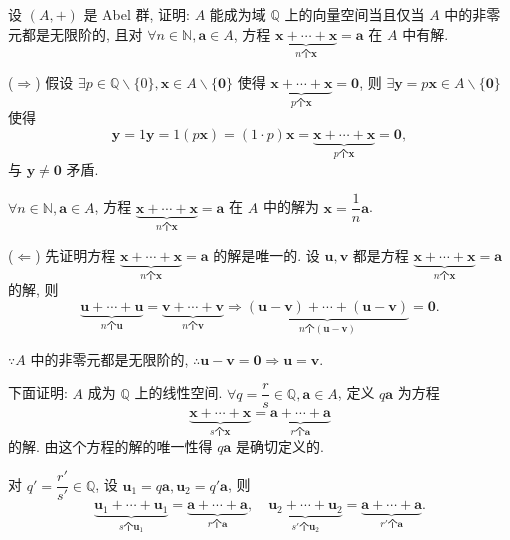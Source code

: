 \documentclass[color=black,device=normal,lang=cn,mode=geye]{elegantnote}
\begin{document}
\begin{exercisec}[1.1.14]
    设 $(A,+)$ 是 Abel 群, 证明: $A$ 能成为域 $\mathbb{Q}$ 上的向量空间当且仅当 $A$ 中的非零元都是无限阶的, 且对 $\forall n\in\mathbb{N},\boldsymbol{a}\in A$, 方程 $\underbrace{\boldsymbol{x}+\cdots+\boldsymbol{x}}_{n\text{个}\boldsymbol{x}}=\boldsymbol{a}$ 在 $A$ 中有解.
\end{exercisec}
\begin{solution}
    ($\Rightarrow$) 假设 $\exists p\in\mathbb{Q}\backslash\{0\},\boldsymbol{x}\in A\backslash\{\boldsymbol{0}\}$ 使得 $\underbrace{\boldsymbol{x}+\cdots+\boldsymbol{x}}_{p\text{个}\boldsymbol{x}}=\boldsymbol{0}$, 则 $\exists\boldsymbol{y}=p\boldsymbol{x}\in A\backslash\{\boldsymbol{0}\}$ 使得
    \[\boldsymbol{y}=1\boldsymbol{y}=1(p\boldsymbol{x})=(1\cdot p)\boldsymbol{x}=\underbrace{\boldsymbol{x}+\cdots+\boldsymbol{x}}_{p\text{个}\boldsymbol{x}}=\boldsymbol{0},\]
    与 $\boldsymbol{y}\neq\boldsymbol{0}$ 矛盾.

    $\forall n\in\mathbb{N},\boldsymbol{a}\in A$, 方程 $\underbrace{\boldsymbol{x}+\cdots+\boldsymbol{x}}_{n\text{个}\boldsymbol{x}}=\boldsymbol{a}$ 在 $A$ 中的解为 $\boldsymbol{x}=\dfrac{1}{n}\boldsymbol{a}$.

    ($\Leftarrow$) 先证明方程 $\underbrace{\boldsymbol{x}+\cdots+\boldsymbol{x}}_{n\text{个}\boldsymbol{x}}=\boldsymbol{a}$ 的解是唯一的. 设 $\boldsymbol{u},\boldsymbol{v}$ 都是方程 $\underbrace{\boldsymbol{x}+\cdots+\boldsymbol{x}}_{n\text{个}\boldsymbol{x}}=\boldsymbol{a}$ 的解, 则
    \[\underbrace{\boldsymbol{u}+\cdots+\boldsymbol{u}}_{n\text{个}\boldsymbol{u}}=\underbrace{\boldsymbol{v}+\cdots+\boldsymbol{v}}_{n\text{个}\boldsymbol{v}}\Rightarrow\underbrace{(\boldsymbol{u}-\boldsymbol{v})+\cdots+(\boldsymbol{u}-\boldsymbol{v})}_{n\text{个}(\boldsymbol{u}-\boldsymbol{v})}=\boldsymbol{0}.\]

    $\because A$ 中的非零元都是无限阶的, $\therefore\boldsymbol{u}-\boldsymbol{v}=\boldsymbol{0}\Rightarrow\boldsymbol{u}=\boldsymbol{v}$.

    下面证明: $A$ 成为 $\mathbb{Q}$ 上的线性空间. $\forall q=\dfrac{r}{s}\in\mathbb{Q},\boldsymbol{a}\in A$, 定义 $q\boldsymbol{a}$ 为方程
    \[\underbrace{\boldsymbol{x}+\cdots+\boldsymbol{x}}_{s\text{个}\boldsymbol{x}}=\underbrace{\boldsymbol{a}+\cdots+\boldsymbol{a}}_{r\text{个}\boldsymbol{a}}\]
    的解. 由这个方程的解的唯一性得 $q\boldsymbol{a}$ 是确切定义的.

    对 $q'=\dfrac{r'}{s'}\in\mathbb{Q}$, 设 $\boldsymbol{u}_1=q\boldsymbol{a},\boldsymbol{u}_2=q'\boldsymbol{a}$, 则
    \[\underbrace{\boldsymbol{u}_1+\cdots+\boldsymbol{u}_1}_{s\text{个}\boldsymbol{u}_1}=\underbrace{\boldsymbol{a}+\cdots+\boldsymbol{a}}_{r\text{个}\boldsymbol{a}},\quad\underbrace{\boldsymbol{u}_2+\cdots+\boldsymbol{u}_2}_{s'\text{个}\boldsymbol{u}_2}=\underbrace{\boldsymbol{a}+\cdots+\boldsymbol{a}}_{r'\text{个}\boldsymbol{a}}.\]


\end{solution}
\end{document}
